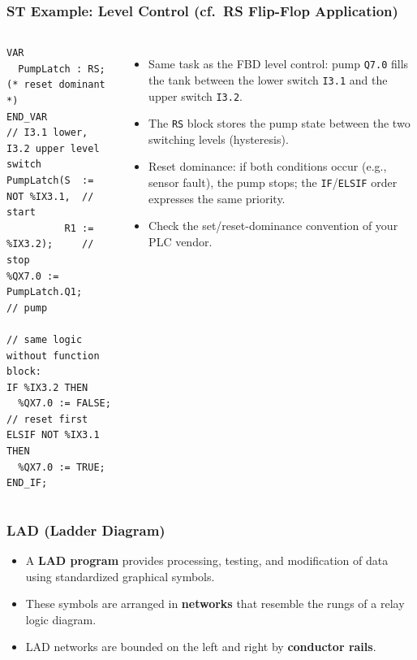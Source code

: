 \begin{frame}[fragile]
	\frametitle{ST Example: Level Control (cf.\ RS Flip-Flop Application)}
	\begin{columns}[T,onlytextwidth]
\begin{lstlisting}[style=st]
VAR
  PumpLatch : RS;  (* reset dominant *)
END_VAR
// I3.1 lower, I3.2 upper level switch
PumpLatch(S  := NOT %IX3.1,  // start
          R1 := %IX3.2);     // stop
%QX7.0 := PumpLatch.Q1;      // pump

// same logic without function block:
IF %IX3.2 THEN
  %QX7.0 := FALSE;           // reset first
ELSIF NOT %IX3.1 THEN
  %QX7.0 := TRUE;
END_IF;
\end{lstlisting}
		\footnotesize
		\begin{itemize}
			\item Same task as the FBD level control: pump \texttt{Q7.0} fills the tank between the lower switch \texttt{I3.1} and the upper switch \texttt{I3.2}.
			\item The \texttt{RS} block stores the pump state between the two switching levels (hysteresis).
			\item Reset dominance: if both conditions occur (e.g., sensor fault), the pump stops; the \texttt{IF}/\texttt{ELSIF} order expresses the same priority.
			\item Check the set/reset-dominance convention of your PLC vendor.
		\end{itemize}
	\end{columns}
\end{frame}

\begin{frame}
	\frametitle{LAD (Ladder Diagram)}
	\begin{itemize}
		\item A \textbf{LAD program} provides processing, testing, and modification of data using standardized graphical symbols.
		\item These symbols are arranged in \textbf{networks} that resemble the rungs of a relay logic diagram.
		\item LAD networks are bounded on the left and right by \textbf{conductor rails}.
	\end{itemize}
\end{frame}

